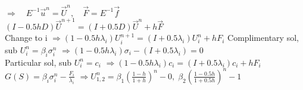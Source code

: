 \documentclass[8pt]{extarticle} %
\begin{document}
\begin{multicols*}{3}
\begin{math}
  \Rightarrow\quad E^{-1}\vec{u}^n=\vec{U}^n,\quad\vec{F}=E^{-1}\vec{f}
  \end{math}\\
  \begin{math}
  (I-0.5hD)\vec{U}^{n+1}=(I+0.5D)\vec{U}^n+h\vec{F}
  \end{math}\\
  Change to i \begin{math}
  \Rightarrow(1-0.5h\lambda_i)U_i^{n+1}=(I+0.5\lambda_i)U_i^n+hF_i
  \end{math}
  Complimentary sol, sub $U_i^n=\beta_i\sigma_i^n$ \begin{math}
  \Rightarrow(1-0.5h\lambda_i)\sigma_i-(I+0.5\lambda_i) = 0 
  \end{math}\\
  Particular sol, sub $U_i^n=c_i$ \begin{math}
  \Rightarrow(1-0.5h\lambda_i)c_i=(I+0.5\lambda_i)c_i+hF_i 
  \end{math}\\
  \begin{math}
  G(S)=\beta_i\sigma_i^n-\frac{F_i}{\lambda_i}
  \end{math}
  \begin{math}
  \Rightarrow U_{1,2}^n=\beta_1(\frac{1-h}{1+h})^n-0,\; \beta_2(\frac{1-0.5h}{1+0.5h})^n-1
  \end{math}

\end{multicols*}
\end{document}
